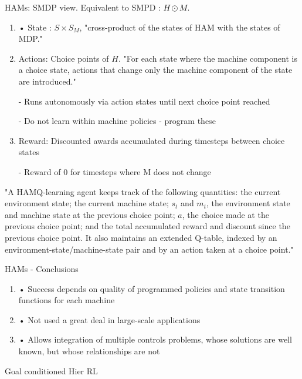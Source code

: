 \documentclass[english]{article}
\begin{document}
\item HAMs: SMDP view. Equivalent to SMPD : $H \odot M$. 

\begin{enumerate}
\item 
• State : $S \times S_M$, "cross-product of the states of HAM with the states of MDP."

\item  Actions: Choice points of $H$. "For each state where the machine component is a choice state,
actions that change only the machine component of the state are introduced."

- Runs autonomously via action states until next choice point reached

- Do not learn within machine policies - program these

\item  Reward: Discounted awards accumulated during timesteps
between choice states

- Reward of 0 for timesteps where M does not change
\end{enumerate}


"A HAMQ-learning agent keeps track of the following quantities:  the current environment
state; the current machine state; $s_t$ and $m_t$, the environment state and machine state at
the previous choice point; $a$, the choice made at the previous choice point; and the total accumulated reward and discount since the previous choice point. It also maintains
an extended Q-table, indexed by an environment-state/machine-state
pair and by an action taken at a choice point."

\item 
HAMs - Conclusions


\begin{enumerate}
\item 
• Success depends on quality of programmed policies and
state transition functions for each machine

\item • Not used a great deal in large-scale applications


\item  • Allows integration of multiple controls problems, whose
solutions are well known, but whose relationships are not
\end{enumerate}


\eenum

\item Goal conditioned Hier RL

\eenum
\end{document}

